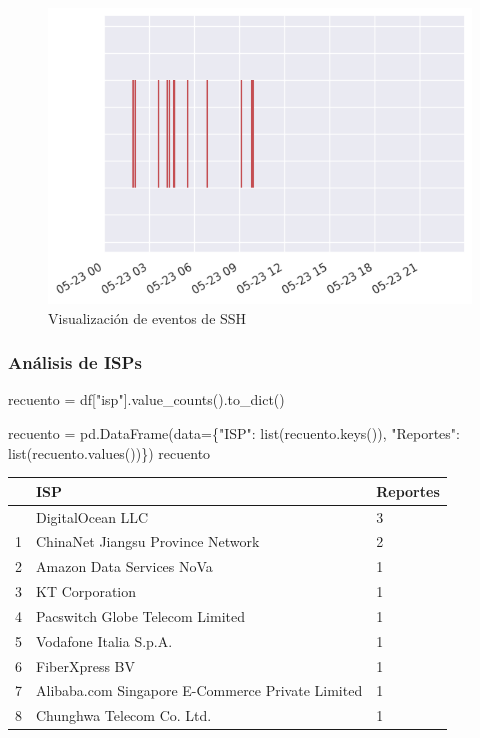 \documentclass[
  letterpaper,
  DIV=11,
  numbers=noendperiod]{scrartcl}
\newenvironment{Shaded}{\begin{snugshade}}{\end{snugshade}}
\newcommand{\BuiltInTok}[1]{\textcolor[rgb]{0.00,0.23,0.31}{#1}}
\newcommand{\NormalTok}[1]{\textcolor[rgb]{0.00,0.23,0.31}{#1}}
\newcommand{\OperatorTok}[1]{\textcolor[rgb]{0.37,0.37,0.37}{#1}}
\newcommand{\StringTok}[1]{\textcolor[rgb]{0.13,0.47,0.30}{#1}}
\begin{document}
\begin{figure}[H]

{\centering \includegraphics{Análisis_files/figure-pdf/fig-eventos-output-1.png}

}

\caption{\label{fig-eventos}Visualización de eventos de SSH}

\end{figure}

\hypertarget{anuxe1lisis-de-isps}{%
\subsubsection{Análisis de ISPs}\label{anuxe1lisis-de-isps}}

\begin{Shaded}
\begin{Highlighting}[]
\NormalTok{recuento }\OperatorTok{=}\NormalTok{ df[}\StringTok{"isp"}\NormalTok{].value\_counts().to\_dict()}

\NormalTok{recuento }\OperatorTok{=}\NormalTok{ pd.DataFrame(data}\OperatorTok{=}\NormalTok{\{}\StringTok{"ISP"}\NormalTok{: }\BuiltInTok{list}\NormalTok{(recuento.keys()), }\StringTok{"Reportes"}\NormalTok{: }\BuiltInTok{list}\NormalTok{(recuento.values())\})}
\NormalTok{recuento}
\end{Highlighting}
\end{Shaded}

\begin{longtable}[]{@{}lll@{}}
\toprule\noalign{}
& ISP & Reportes \\
\midrule\noalign{}
\endhead
\bottomrule\noalign{}
\endlastfoot
0 & DigitalOcean LLC & 3 \\
1 & ChinaNet Jiangsu Province Network & 2 \\
2 & Amazon Data Services NoVa & 1 \\
3 & KT Corporation & 1 \\
4 & Pacswitch Globe Telecom Limited & 1 \\
5 & Vodafone Italia S.p.A. & 1 \\
6 & FiberXpress BV & 1 \\
7 & Alibaba.com Singapore E-Commerce Private Limited & 1 \\
8 & Chunghwa Telecom Co. Ltd. & 1 \\
\end{longtable}
\end{document}
